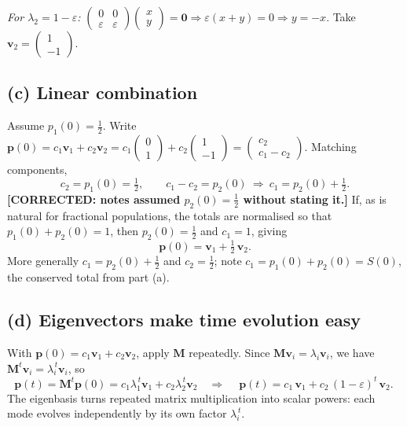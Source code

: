 \documentclass[12pt,a4paper]{article}
\newcommand{\fix}[1]{{\textbf{\textcolor{orange!85!black}{[CORRECTED: #1]}}}}
\theoremstyle{definition}
\newcommand{\Mx}{\mathbf{M}}
\newcommand{\vv}{\mathbf{v}}
\newcommand{\pp}{\mathbf{p}}
\newcommand{\zero}{\mathbf{0}}
\begin{document}
\textit{For $\lambda_2=1-\varepsilon$:}\quad
$\begin{pmatrix}0 & 0\\ \varepsilon & \varepsilon\end{pmatrix}\!\begin{pmatrix}x\\ y\end{pmatrix}=\zero
\Rightarrow \varepsilon(x+y)=0\Rightarrow y=-x$. Take
$\displaystyle \vv_2=\begin{pmatrix}1\\-1\end{pmatrix}.$

\subsection{(c) Linear combination}

Assume $p_1(0)=\tfrac12$. Write
$\pp(0)=c_1\vv_1+c_2\vv_2=c_1\!\begin{pmatrix}0\\1\end{pmatrix}+c_2\!\begin{pmatrix}1\\-1\end{pmatrix}
=\begin{pmatrix}c_2\\ c_1-c_2\end{pmatrix}.$
Matching components,
\[
c_2=p_1(0)=\tfrac12,\qquad c_1-c_2=p_2(0)\ \Rightarrow\ c_1=p_2(0)+\tfrac12 .
\]
\fix{notes assumed $p_2(0)=\tfrac12$ without stating it.} If, as is natural for
fractional populations, the totals are normalised so that
$p_1(0)+p_2(0)=1$, then $p_2(0)=\tfrac12$ and $c_1=1$, giving
\[
\boxed{\ \pp(0)=\vv_1+\tfrac12\,\vv_2.\ }
\]
More generally $c_1=p_2(0)+\tfrac12$ and $c_2=\tfrac12$; note
$c_1=p_1(0)+p_2(0)=S(0)$, the conserved total from part (a).

\subsection{(d) Eigenvectors make time evolution easy}

With $\pp(0)=c_1\vv_1+c_2\vv_2$, apply $\Mx$ repeatedly. Since
$\Mx\vv_i=\lambda_i\vv_i$, we have $\Mx^{t}\vv_i=\lambda_i^{\,t}\vv_i$, so
\[
\pp(t)=\Mx^{t}\pp(0)=c_1\lambda_1^{\,t}\vv_1+c_2\lambda_2^{\,t}\vv_2
\quad\Longrightarrow\quad
\boxed{\ \pp(t)=c_1\,\vv_1+c_2\,(1-\varepsilon)^{t}\,\vv_2.\ }
\]
The eigenbasis turns repeated matrix multiplication into scalar powers: each
mode evolves independently by its own factor $\lambda_i^{\,t}$.
\end{document}
